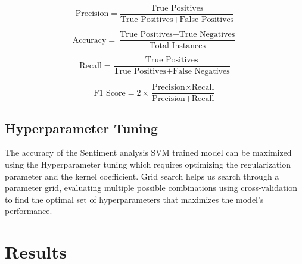 \documentclass[11pt,article,oneside]{article}
\begin{document}
\begin{equation*}
\text{Precision} = \frac{\text{True Positives}}{\text{True Positives} + \text{False Positives}}
\end{equation*}

\begin{equation*}
\text{Accuracy} = \frac{\text{True Positives} + \text{True Negatives}}{\text{Total Instances}}
\end{equation*}

\begin{equation*}
\text{Recall} = \frac{\text{True Positives}}{\text{True Positives} + \text{False Negatives}}
\end{equation*}

\begin{equation*}
\text{F1 Score} = 2 \times \frac{\text{Precision} \times \text{Recall}}{\text{Precision} + \text{Recall}}
\end{equation*}

\subsection{Hyperparameter Tuning}
The accuracy of the Sentiment analysis SVM trained model can be maximized using the Hyperparameter tuning which requires optimizing the regularization parameter and the kernel coefficient. Grid search\citep{hyerparameterTuning} helps us search through a parameter grid, evaluating multiple possible combinations using cross-validation to find the optimal set of hyperparameters that maximizes the model's performance.

\section{Results}
\end{document}
